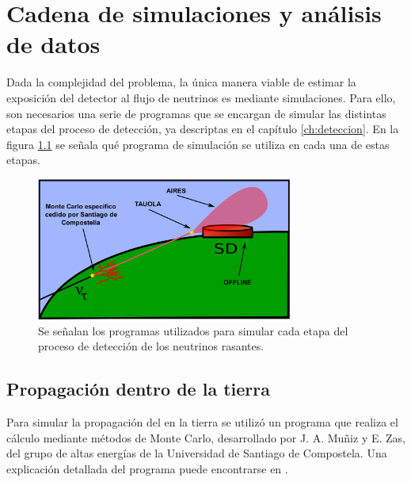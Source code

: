 \chapter{Cadena de simulaciones y an\'alisis de datos}


Dada la complejidad del problema, la \'unica manera viable de estimar la exposici\'on del detector al flujo de neutrinos es mediante simulaciones.
Para ello, son necesarios una serie de programas que se encargan de simular las distintas etapas del proceso de detecci\'on, ya descriptas en el cap\'itulo \ref{ch:deteccion}.
En la figura \ref{fig:sim_chain} se se\~nala qu\'e programa de simulaci\'on se utiliza en cada una de estas etapas.
%
\begin{figure}[h!]
	\begin{center}
	\includegraphics[width=0.75\textwidth]{fig/simulacionAuger/sim_chain}
	\caption{\label{fig:sim_chain} Se se\~nalan los programas utilizados para simular cada etapa del proceso de detecci\'on de los neutrinos rasantes.}
	\end{center}
\end{figure}
%

	\section{\label{sc:sim_prop_tierra}Propagaci\'on dentro de la tierra}
	
	Para simular la propagaci\'on del \tauon{} en la tierra se utiliz\'o un programa que realiza el c\'alculo mediante m\'etodos de Monte Carlo, desarrollado por J. A. Mu\~niz y E. Zas, del grupo de altas energ\'ias de la Universidad de Santiago de Compostela.
	Una explicaci\'on detallada del programa puede encontrarse en \cite{gap_tau_tierra}.
	
